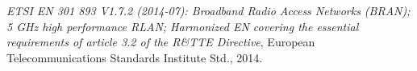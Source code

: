 %

\begin{thebibliography}{99.}%
 \emph{ETSI EN 301 893 V1.7.2 (2014-07): Broadband Radio Access Networks (BRAN);	5 GHz high performance RLAN; Harmonized EN covering the essential requirements of article 3.2 of the R\&TTE Directive}, European Telecommunications Standards Institute Std., 2014.
\end{thebibliography}